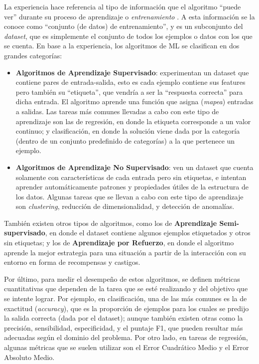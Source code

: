\documentclass[../../main.tex]{subfiles}
\begin{document}
La experiencia hace referencia al tipo de información que el algoritmo ``puede ver'' durante su proceso de aprendizaje o \textit{entrenamiento} \cite{hands-on-ML-sklearn-tf}. A esta información se la conoce como ``conjunto (de datos) de entrenamiento'', y es un subconjunto del \textit{dataset}, que es simplemente el conjunto de todos los ejemplos o datos con los que se cuenta. En base a la experiencia, los algoritmos de ML se clasifican en dos grandes categorías:
\begin{itemize}
    \item \textbf{Algoritmos de Aprendizaje Supervisado}: experimentan un dataset que contiene pares de entrada-salida, esto es cada ejemplo contiene sus features pero también su ``etiqueta'', que vendría a ser la ``respuesta correcta'' para dicha entrada. El algoritmo aprende una función que asigna (\textit{mapea}) entradas a salidas. Las tareas más comunes llevadas a cabo con este tipo de aprendizaje son las de regresión, en donde la etiqueta corresponde a un valor continuo; y clasificación, en donde la solución viene dada por la categoría (dentro de un conjunto predefinido de categorías) a la que pertenece un ejemplo.
    \item \textbf{Algoritmos de Aprendizaje No Supervisado}: ven un dataset que cuenta solamente con características de cada entrada pero sin etiquetas, e intentan aprender automáticamente patrones y propiedades útiles de la estructura de los datos. Algunas tareas que se llevan a cabo con este tipo de aprendizaje son \textit{clustering}, reducción de dimensionalidad, y detección de anomalías.
\end{itemize}
También existen otros tipos de algoritmos, como los de \textbf{Aprendizaje Semi-supervisado}, en donde el dataset contiene algunos ejemplos etiquetados y otros sin etiquetas; y los de \textbf{Aprendizaje por Refuerzo}, en donde el algoritmo aprende la mejor estrategia para una situación a partir de la interacción con su entorno en forma de recompensas y castigos.

Por último, para medir el desempeño de estos algoritmos, se definen métricas cuantitativas que dependen de la tarea que se esté realizando y del objetivo que se intente lograr. Por ejemplo, en clasificación, una de las más comunes es la de exactitud (\textit{accuracy}), que es la proporción de ejemplos para los cuales se predijo la salida correcta (dada por el dataset); aunque también existen otras como la precisión, sensibilidad, especificidad, y el puntaje F1, que pueden resultar más adecuadas según el dominio del problema. Por otro lado, en tareas de regresión, algunas métricas que se suelen utilizar son el Error Cuadrático Medio y el Error Absoluto Medio. 
\end{document}
